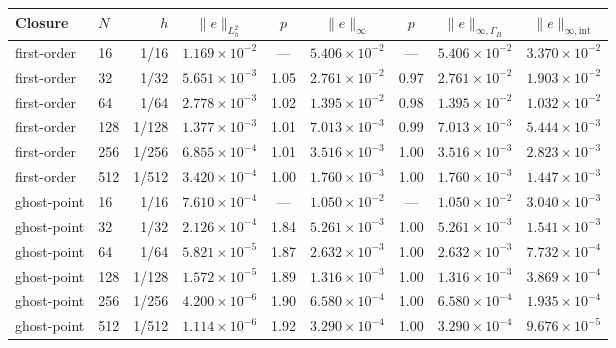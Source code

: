 \begin{tabular}{@{}llrcccccc@{}}\toprule
Closure & $N$ & $h$ & $\|e\|_{L^2_h}$ & $p$ & $\|e\|_{\infty}$ & $p$ & $\|e\|_{\infty,\Gamma_B}$ & $\|e\|_{\infty,\mathrm{int}}$\\\midrule
first-order & 16 & 1/16 & $1.169\times10^{-2}$ & --- & $5.406\times10^{-2}$ & --- & $5.406\times10^{-2}$ & $3.370\times10^{-2}$\\
first-order & 32 & 1/32 & $5.651\times10^{-3}$ & 1.05 & $2.761\times10^{-2}$ & 0.97 & $2.761\times10^{-2}$ & $1.903\times10^{-2}$\\
first-order & 64 & 1/64 & $2.778\times10^{-3}$ & 1.02 & $1.395\times10^{-2}$ & 0.98 & $1.395\times10^{-2}$ & $1.032\times10^{-2}$\\
first-order & 128 & 1/128 & $1.377\times10^{-3}$ & 1.01 & $7.013\times10^{-3}$ & 0.99 & $7.013\times10^{-3}$ & $5.444\times10^{-3}$\\
first-order & 256 & 1/256 & $6.855\times10^{-4}$ & 1.01 & $3.516\times10^{-3}$ & 1.00 & $3.516\times10^{-3}$ & $2.823\times10^{-3}$\\
first-order & 512 & 1/512 & $3.420\times10^{-4}$ & 1.00 & $1.760\times10^{-3}$ & 1.00 & $1.760\times10^{-3}$ & $1.447\times10^{-3}$\\
\midrule
ghost-point & 16 & 1/16 & $7.610\times10^{-4}$ & --- & $1.050\times10^{-2}$ & --- & $1.050\times10^{-2}$ & $3.040\times10^{-3}$\\
ghost-point & 32 & 1/32 & $2.126\times10^{-4}$ & 1.84 & $5.261\times10^{-3}$ & 1.00 & $5.261\times10^{-3}$ & $1.541\times10^{-3}$\\
ghost-point & 64 & 1/64 & $5.821\times10^{-5}$ & 1.87 & $2.632\times10^{-3}$ & 1.00 & $2.632\times10^{-3}$ & $7.732\times10^{-4}$\\
ghost-point & 128 & 1/128 & $1.572\times10^{-5}$ & 1.89 & $1.316\times10^{-3}$ & 1.00 & $1.316\times10^{-3}$ & $3.869\times10^{-4}$\\
ghost-point & 256 & 1/256 & $4.200\times10^{-6}$ & 1.90 & $6.580\times10^{-4}$ & 1.00 & $6.580\times10^{-4}$ & $1.935\times10^{-4}$\\
ghost-point & 512 & 1/512 & $1.114\times10^{-6}$ & 1.92 & $3.290\times10^{-4}$ & 1.00 & $3.290\times10^{-4}$ & $9.676\times10^{-5}$\\
\bottomrule
\end{tabular}
